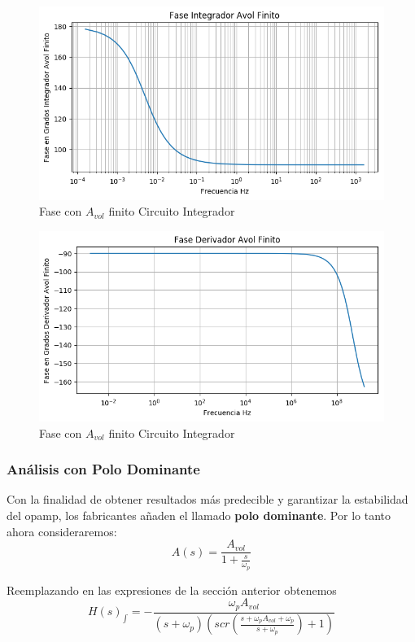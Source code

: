 \begin{figure}[H]
	\centering
	\includegraphics[width=\textwidth]{Ejercicio4/BODE-AVOL-FINITO-FASE-INTEGRADOR}
	\caption{Fase con $A_{vol}$ finito Circuito Integrador}
\end{figure}

\begin{figure}[H]
	\centering
	\includegraphics[width=\textwidth]{Ejercicio4/BODE-AVOL-FINITO-FASE-DERIVADOR}
	\caption{Fase con $A_{vol}$ finito Circuito Integrador}
\end{figure}

\subsubsection{Análisis con Polo Dominante}
Con la finalidad de obtener resultados más predecible y garantizar la estabilidad del opamp, los fabricantes añaden el llamado \textbf{polo dominante}.
Por lo tanto ahora consideraremos:
$$A(s)=\frac{A_{vol}}{1+\frac{s}{\omega_p}}$$

Reemplazando en las expresiones de la sección anterior obtenemos
$$H(s)_{\int}=- \frac{\omega_p A_{vol}}{\left(s + \omega_p\right) \left(s c r{\left (\frac{s + \omega_p A_{vol} + \omega_p}{s + \omega_p} \right )} + 1\right)}$$


